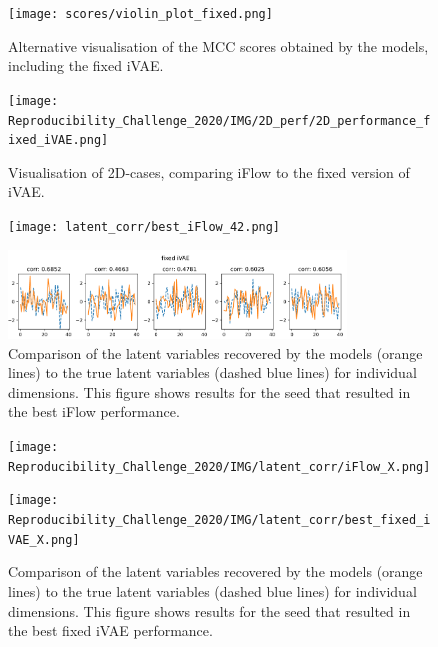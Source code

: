 \begin{figure}[ht]
    \centering
    \texttt{[image: scores/violin\_plot\_fixed.png]} 
    \caption{Alternative visualisation of the MCC scores obtained by the models, including the fixed iVAE.} 
    \label{fig:violinplot} 
\end{figure}

\begin{figure}[ht]
    \centering
    \texttt{[image: Reproducibility\_Challenge\_2020/IMG/2D\_perf/2D\_performance\_fixed\_iVAE.png]} 
    \caption{Visualisation of 2D-cases, comparing iFlow to the fixed version of iVAE.} 
    \label{fig:fixedMCCscores} 
\end{figure}

\begin{figure}[!htbp]
    \centering
    \begin{minipage}[b]{\textwidth}
        \centering
       \texttt{[image: latent\_corr/best\_iFlow\_42.png]}
    \end{minipage}
    \begin{minipage}[b]{\textwidth}
    \centering
       \includegraphics[width=0.8\textwidth]{IMG/latent_corr/fixed_iVAE_42.png}
    \end{minipage}
    \caption{Comparison of the latent variables recovered by the models (orange lines) to the true latent variables (dashed blue lines) for individual dimensions. This figure shows results for the seed that resulted in the best iFlow performance.}
    \label{fig:latentcorr_fixed1}
\end{figure}

\begin{figure}[!htbp]
    \centering
    \begin{minipage}[b]{\textwidth}
        \centering
       \texttt{[image: Reproducibility\_Challenge\_2020/IMG/latent\_corr/iFlow\_X.png]}
    \end{minipage}
    \begin{minipage}[b]{\textwidth}
    \centering
       \texttt{[image: Reproducibility\_Challenge\_2020/IMG/latent\_corr/best\_fixed\_iVAE\_X.png]}
    \end{minipage}
    \caption{Comparison of the latent variables recovered by the models (orange lines) to the true latent variables (dashed blue lines) for individual dimensions. This figure shows results for the seed that resulted in the best fixed iVAE performance.}
    \label{fig:latentcorr_fixed1}
\end{figure}
